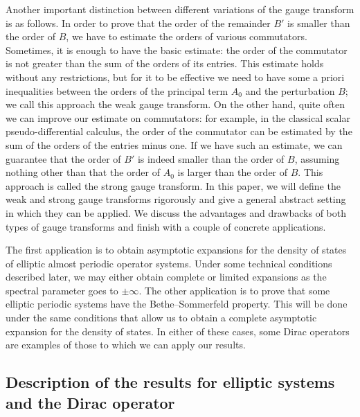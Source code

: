 \documentclass[AHL,Unicode,longabstracts,published]{cedram}
\begin{document}
Another important distinction between different variations of the gauge transform is as follows. In order to prove that the order of the remainder $B'$ is smaller than the order of $B$, we have to estimate the orders of various commutators. Sometimes, it is enough to have the basic estimate: the order of the commutator is not greater than the sum of the orders of its entries. This estimate holds without any restrictions, but for it to be effective we need to have some a priori inequalities between the orders of the principal term $A_0$ and the perturbation $B$; we call this approach the weak gauge transform. On the other hand, quite often we can improve our estimate on commutators: for example, in the classical scalar pseudo-differential calculus, the order of the commutator can be estimated by the sum of the orders of the entries minus one. If we have such an estimate, we can guarantee that the order of $B'$ is indeed smaller than the order of $B$, assuming nothing other than that the order of $A_0$ is larger than the order of $B$. This approach is called the strong gauge transform. In this paper, we will define the weak and strong gauge transforms rigorously and give a general abstract setting in which they can be applied. We discuss the advantages and drawbacks of both types of gauge transforms and finish with a couple of concrete applications.

The first application is to obtain asymptotic expansions for the density of states of elliptic almost periodic operator systems. Under some technical conditions described later, we may either obtain complete or limited expansions as the spectral parameter goes to $\pm\infty$. The other application is to prove that some elliptic periodic systems have the Bethe--Sommerfeld property. This will be done under the same conditions that allow us to obtain a complete asymptotic expansion for the density of states. In either of these cases, some Dirac operators are examples of those to which we can apply our results.

\subsection{Description of the results for elliptic systems and the Dirac operator}
\end{document}
